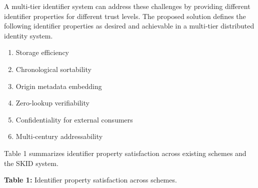 \documentclass[fleqn,10pt,lineno]{wlpeerj}
\providecommand{\tightlist}{%
  \setlength{\itemsep}{0pt}\setlength{\parskip}{0pt}}
\begin{document}
A multi-tier identifier system can address these challenges by providing
different identifier properties for different trust levels. The proposed
solution defines the following identifier properties as desired and
achievable in a multi-tier distributed identity system.

\begin{enumerate}
\def\labelenumi{\arabic{enumi}.}
\tightlist
\item
  Storage efficiency
\item
  Chronological sortability
\item
  Origin metadata embedding
\item
  Zero-lookup verifiability
\item
  Confidentiality for external consumers
\item
  Multi-century addressability
\end{enumerate}

Table 1 summarizes identifier property satisfaction across existing
schemes and the SKID system.

\textbf{Table 1:} Identifier property satisfaction across schemes.
\end{document}
